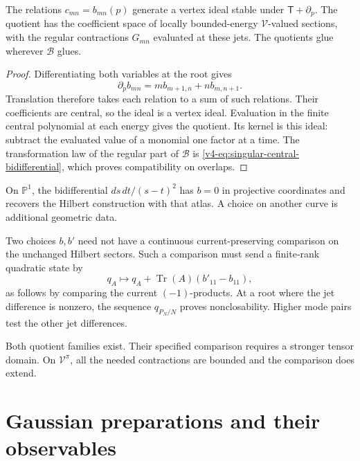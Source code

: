 \begin{proposition}\label{v4-prop:singular-bidifferential-quotient}
The relations \(c_{mn}=b_{mn}(p)\) generate
a vertex ideal stable under
\(\mathsf T+\partial_p\). The quotient
has the coefficient space of locally
bounded-energy \(\mathcal V\)-valued
sections, with the regular contractions
\(G_{mn}\) evaluated at these jets.
The quotients glue wherever \(\mathcal B\) glues.
\end{proposition}

\begin{proof}
Differentiating both variables at the root gives
\[
                  \partial_pb_{mn}
                       =m b_{m+1,n}+n b_{m,n+1}.
\]
Translation therefore takes each relation
to a sum of such relations. Their
coefficients are central, so the ideal
is a vertex ideal. Evaluation in the
finite central polynomial at each energy
gives the quotient. Its kernel is this
ideal: subtract the evaluated value of
a monomial one factor at a time.
The transformation law of the regular
part of \(\mathcal B\) is
\eqref{v4-eq:singular-central-bidifferential},
which proves compatibility on overlaps.
\end{proof}

On \(\mathbb P^1\), the bidifferential
\(ds\,dt/(s-t)^2\) has \(b=0\) in
projective coordinates and recovers
the Hilbert construction with that
atlas. A choice on another curve is
additional geometric data.

Two choices \(b,b'\) need not have a
continuous current-preserving comparison
on the unchanged Hilbert sectors. Such
a comparison must send a finite-rank
quadratic state by
\begin{equation}\label{v4-eq:singular-background-change}
                q_A\longmapsto
                    q_A+\operatorname{Tr}(A)(b'_{11}-b_{11}),
\end{equation}
as follows by comparing the current
\((-1)\)-products. At a root where
the jet difference is nonzero, the
sequence \(q_{P_N/N}\) proves
nonclosability. Higher mode pairs
test the other jet differences.

Both quotient families exist. Their
specified comparison requires a
stronger tensor domain. On
\(\mathcal V^\pi\), all the needed
contractions are bounded and the
comparison does extend.

\section{Gaussian preparations and their observables}
\label{v4-sec:singular-gaussian}

